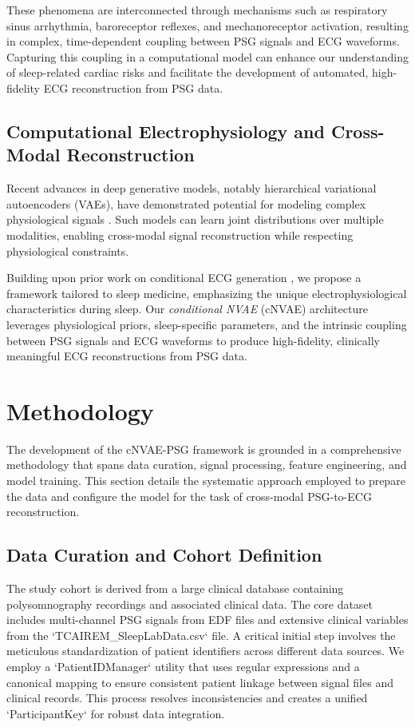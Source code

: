 \documentclass[10pt, conference]{IEEEtran}
\begin{document}
These phenomena are interconnected through mechanisms such as respiratory sinus arrhythmia, baroreceptor reflexes, and mechanoreceptor activation, resulting in complex, time-dependent coupling between PSG signals and ECG waveforms. Capturing this coupling in a computational model can enhance our understanding of sleep-related cardiac risks and facilitate the development of automated, high-fidelity ECG reconstruction from PSG data.

\subsection{Computational Electrophysiology and Cross-Modal Reconstruction}

Recent advances in deep generative models, notably hierarchical variational autoencoders (VAEs), have demonstrated potential for modeling complex physiological signals \cite{vahdat2020}. Such models can learn joint distributions over multiple modalities, enabling cross-modal signal reconstruction while respecting physiological constraints.

Building upon prior work on conditional ECG generation \cite{sviridov2024}, we propose a framework tailored to sleep medicine, emphasizing the unique electrophysiological characteristics during sleep. Our \textit{conditional NVAE} (cNVAE) architecture leverages physiological priors, sleep-specific parameters, and the intrinsic coupling between PSG signals and ECG waveforms to produce high-fidelity, clinically meaningful ECG reconstructions from PSG data.

\section{Methodology}

The development of the cNVAE-PSG framework is grounded in a comprehensive methodology that spans data curation, signal processing, feature engineering, and model training. This section details the systematic approach employed to prepare the data and configure the model for the task of cross-modal PSG-to-ECG reconstruction.

\subsection{Data Curation and Cohort Definition}
The study cohort is derived from a large clinical database containing polysomnography recordings and associated clinical data. The core dataset includes multi-channel PSG signals from EDF files and extensive clinical variables from the `TCAIREM_SleepLabData.csv` file. A critical initial step involves the meticulous standardization of patient identifiers across different data sources. We employ a `PatientIDManager` utility that uses regular expressions and a canonical mapping to ensure consistent patient linkage between signal files and clinical records. This process resolves inconsistencies and creates a unified `ParticipantKey` for robust data integration.
\end{document}
